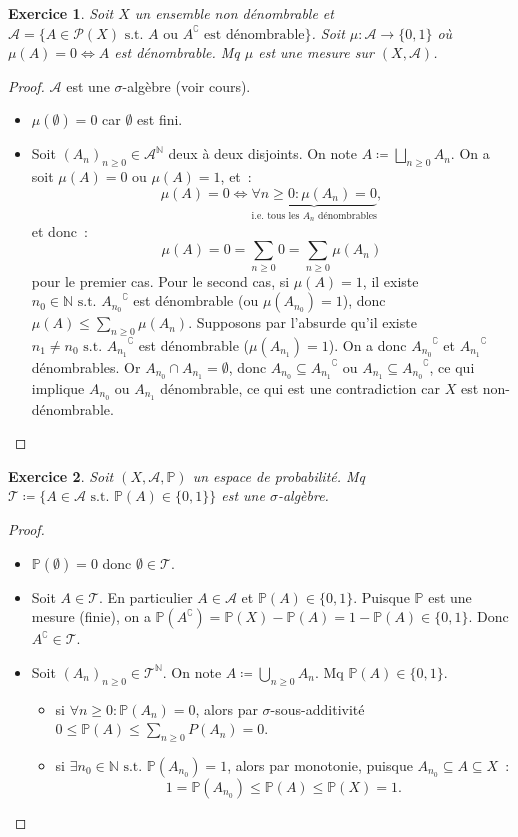 \documentclass{article}
\newtheorem{ex}{Exercice}[section]
\newcommand{\st}{\text{ s.t. }}
\newcommand{\C}{\complement}
\newcommand{\N}{{\mathbb N}}
\renewcommand{\P}{{\mathbb P}}
\begin{document}
\begin{ex} Soit $X$ un ensemble non dénombrable et $\mathcal A = \{A \in \mathcal P(X) \st A \text{ ou } A^\C \text{ est dénombrable}\}$. Soit $\mu : \mathcal A \to \{0, 1\}$
où $\mu(A) = 0 \iff A$ est dénombrable. Mq $\mu$ est une mesure sur $(X, \mathcal A)$.
\end{ex}

\begin{proof} $\mathcal A$ est une $\sigma$-algèbre (voir cours).
\begin{itemize}
	\item $\mu(\emptyset) = 0$ car $\emptyset$ est fini.
	\item Soit $(A_n)_{n \geq 0} \in \mathcal A^\N$ deux à deux disjoints. On note $A \coloneqq \bigsqcup_{n \geq 0}A_n$. On a soit $\mu(A) = 0$ ou $\mu(A) = 1$, et~:
	\[\mu(A) = 0 \iff \underbrace {\forall n \geq 0 : \mu(A_n) = 0}_{\text{i.e. tous les $A_n$ dénombrables}},\]
	et donc~:
	\[\mu(A) = 0 = \sum_{n \geq 0}0 = \sum_{n \geq 0}\mu(A_n)\]
	pour le premier cas. Pour le second cas, si $\mu(A) = 1$, il existe $n_0 \in \N \st {A_{n_0}}^\C$ est dénombrable (ou $\mu(A_{n_0}) = 1$), donc $\mu(A) \leq \sum_{n \geq 0}\mu(A_n)$.
	Supposons par l'absurde qu'il existe $n_1 \neq n_0 \st {A_{n_1}}^\C$ est dénombrable ($\mu(A_{n_1}) = 1$). On a donc ${A_{n_0}}^\C$ et ${A_{n_1}}^\C$ dénombrables.
	Or $A_{n_0} \cap A_{n_1} = \emptyset$, donc 	$A_{n_0} \subseteq {A_{n_1}}^\C$ ou $A_{n_1} \subseteq {A_{n_0}}^\C$, ce qui implique $A_{n_0}$ ou $A_{n_1}$ dénombrable,
	ce qui est une contradiction car $X$ est non-dénombrable.
\end{itemize}
\end{proof}

\begin{ex} Soit $(X, \mathcal A, \P)$ un espace de probabilité. Mq $\mathcal T \coloneqq \{A \in \mathcal A \st \P(A) \in \{0, 1\}\}$ est une $\sigma$-algèbre.
\end{ex}

\begin{proof}~
\begin{itemize}
	\item $\P(\emptyset) = 0$ donc $\emptyset \in \mathcal T$.
	\item Soit $A \in \mathcal T$. En particulier $A \in \mathcal A$ et $\P(A) \in \{0, 1\}$. Puisque $\P$ est une mesure (finie), on a
	$\P(A^\C) = \P(X) - \P(A) = 1 - \P(A) \in \{0, 1\}$. Donc $A^\C \in \mathcal T$.
	\item Soit $(A_n)_{n \geq 0} \in \mathcal T^\N$. On note $A \coloneqq \bigcup_{n \geq 0}A_n$. Mq $\P(A) \in \{0, 1\}$.
	\begin{itemize}
		\item si $\forall n \geq 0 : \P(A_n) = 0$, alors par $\sigma$-sous-additivité $0 \leq \P(A) \leq \sum_{n \geq 0}P(A_n) = 0$.
		\item si $\exists n_0 \in \N \st \P(A_{n_0}) = 1$, alors par monotonie, puisque $A_{n_0} \subseteq A \subseteq X$~:
		\[1 = \P(A_{n_0}) \leq \P(A) \leq \P(X) = 1.\]
	\end{itemize}
\end{itemize}
\end{proof}
\end{document}
